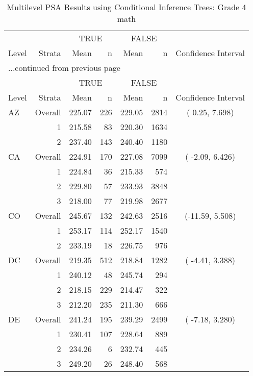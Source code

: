 \begin{longtable}{lrrr@{\extracolsep{.25cm}}rrc}
\caption{Multilevel PSA Results using Conditional Inference Trees: Grade 4 math} \\ 
   \hline & & \multicolumn{2}{c}{TRUE} & \multicolumn{2}{c}{FALSE} & \\ \cline{3-4} \cline{5-6} Level & Strata & Mean & n & Mean & n & Confidence Interval \\ \hline\endfirsthead \multicolumn{7}{l}{{...continued from previous page}}\\ \hline  & & \multicolumn{2}{c}{TRUE} & \multicolumn{2}{c}{FALSE} & \\ \cline{3-4} \cline{5-6} Level & Strata & Mean & n & Mean & n & Confidence Interval \\ \hline \endhead \endfoot \endlastfoot  \hline
AZ & Overall & 225.07 & 226 & 229.05 & 2814 & (  0.25,  7.698) \\ 
   & 1 & 215.58 &  83 & 220.30 & 1634 &  \\ 
   & 2 & 237.40 & 143 & 240.40 & 1180 &  \\ 
   \hline
CA & Overall & 224.91 & 170 & 227.08 & 7099 & ( -2.09,  6.426) \\ 
   & 1 & 224.84 &  36 & 215.33 & 574 &  \\ 
   & 2 & 229.80 &  57 & 233.93 & 3848 &  \\ 
   & 3 & 218.00 &  77 & 219.98 & 2677 &  \\ 
   \hline
CO & Overall & 245.67 & 132 & 242.63 & 2516 & (-11.59,  5.508) \\ 
   & 1 & 253.17 & 114 & 252.17 & 1540 &  \\ 
   & 2 & 233.19 &  18 & 226.75 & 976 &  \\ 
   \hline
DC & Overall & 219.35 & 512 & 218.84 & 1282 & ( -4.41,  3.388) \\ 
   & 1 & 240.12 &  48 & 245.74 & 294 &  \\ 
   & 2 & 218.15 & 229 & 214.47 & 322 &  \\ 
   & 3 & 212.20 & 235 & 211.30 & 666 &  \\ 
   \hline
DE & Overall & 241.24 & 195 & 239.29 & 2499 & ( -7.18,  3.280) \\ 
   & 1 & 230.41 & 107 & 228.64 & 889 &  \\ 
   & 2 & 234.26 &   6 & 232.74 & 445 &  \\ 
   & 3 & 249.20 &  26 & 248.40 & 568 &  \\ 

\end{longtable}
